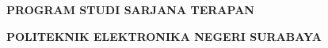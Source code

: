 \begin{titlepage}
\begin{center}

  \end{center}

  \vfill

  \begin{center}
    {\FontCoverRingkasIsi\bfseries PROGRAM STUDI SARJANA TERAPAN\par}
    {\FontCoverRingkasIsi\bfseries \MakeUppercase{\NamaProdi}\par}
    {\FontCoverRingkasIsi\bfseries \MakeUppercase{\NamaDepartemen}\par}
    {\FontCoverRingkasIsi\bfseries POLITEKNIK ELEKTRONIKA NEGERI SURABAYA\par}
    {\FontCoverRingkasIsi\bfseries \TahunLulus\par}
  \end{center}

  \restoregeometry
\end{titlepage}
